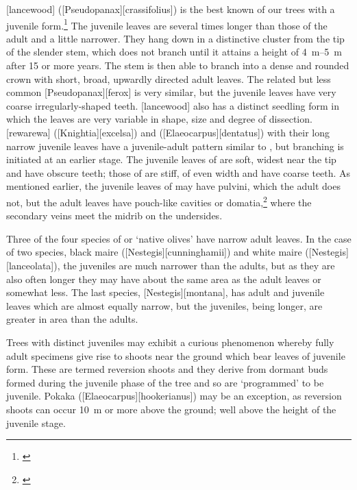 [lancewood] ([Pseudopanax][crassifolius]) is the best known of our trees with a juvenile form.\footnote{\cite{laing1906plants}}
The juvenile leaves are several times longer than those of the adult and a little narrower.
They hang down in a distinctive cluster from the tip of the slender stem, which does not branch until it attains a height of \SIrange{4}{5}{\metre} after 15 or more years.
The stem is then able to branch into a dense and rounded crown with short, broad, upwardly directed adult leaves.
The related but less common [Pseudopanax][ferox] is very similar, but the juvenile leaves have very coarse irregularly-shaped teeth.
[lancewood] also has a distinct seedling form in which the leaves are very variable in shape, size and degree of dissection.
[rewarewa] ([Knightia][excelsa]) and  ([Elaeocarpus][dentatus]) with their long narrow juvenile leaves have a juvenile-adult pattern similar to , but branching is initiated at an earlier stage.
The juvenile leaves of  are soft, widest near the tip and have obscure teeth; those of  are stiff, of even width and have coarse teeth.
As mentioned earlier, the juvenile leaves of  may have pulvini, which the adult does not, but the adult leaves have pouch-like cavities or domatia,\footnote{\cite{sampson1965domatia}} where the secondary veins meet the midrib on the undersides.

Three of the four species of  or `native olives' have narrow adult leaves.
In the case of two species, black maire ([Nestegis][cunninghamii]) and white maire ([Nestegis][lanceolata]), the juveniles are much narrower than the adults, but as they are also often longer they may have about the same area as the adult leaves or somewhat less.
The last species, [Nestegis][montana], has adult and juvenile leaves which are almost equally narrow, but the juveniles, being longer, are greater in area than the adults.

Trees with distinct juveniles may exhibit a curious phenomenon whereby fully adult specimens give rise to shoots near the ground which bear leaves of juvenile form.
These are termed reversion shoots and they derive from dormant buds formed during the juvenile phase of the tree and so are `programmed' to be juvenile.
Pokaka ([Elaeocarpus][hookerianus]) may be an exception, as reversion shoots can occur \SI{10}{\metre} or more above the ground; well above the height of the juvenile stage.

